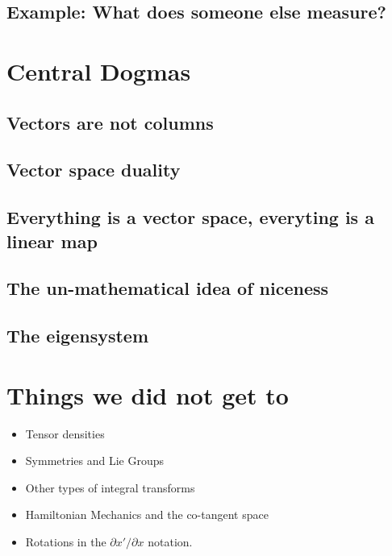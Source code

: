 \documentclass[12pt]{article}
\begin{document}

\subsection{Example: What does someone else measure?}



\section{Central Dogmas}

\subsection{Vectors are not columns}
\subsection{Vector space duality}
\subsection{Everything is a vector space, everyting is a linear map}
\subsection{The un-mathematical idea of niceness}
\subsection{The eigensystem}




\appendix

\section{Things we did not get to}
\begin{itemize}
\item Tensor densities
\item Symmetries and Lie Groups
\item Other types of integral transforms
\item Hamiltonian Mechanics and the co-tangent space
\item Rotations in the $\partial x'/\partial x$ notation.
\end{itemize}
\end{document}
